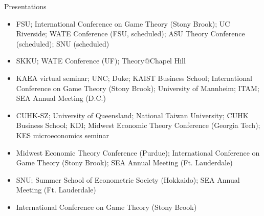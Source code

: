 \begin{rSection}{Presentations}

\begin{itemize}
	\item [\textbf{2026}] FSU; International Conference on Game Theory (Stony Brook); UC Riverside; WATE Conference (FSU, scheduled); ASU Theory Conference (scheduled); SNU (scheduled)
	\item [\textbf{2025}] SKKU; WATE Conference (UF); Theory@Chapel Hill
	\item [\textbf{2024}] KAEA virtual seminar; UNC; Duke; KAIST Business School; International Conference on Game Theory (Stony Brook); University of Mannheim; ITAM; SEA Annual Meeting (D.C.)
	\item [\textbf{2023}] CUHK-SZ; University of Queensland; National Taiwan University; CUHK Business School; KDI; Midwest Economic Theory Conference (Georgia Tech); KES microeconomics seminar
	\item [\textbf{2022}] Midwest Economic Theory Conference (Purdue); International Conference on Game Theory (Stony Brook); SEA Annual Meeting (Ft. Lauderdale)
	\item [\textbf{2019}] SNU; Summer School of Econometric Society (Hokkaido); SEA Annual Meeting (Ft. Lauderdale)
	\item [\textbf{2015}] International Conference on Game Theory (Stony Brook)
\end{itemize}
	

\end{rSection}